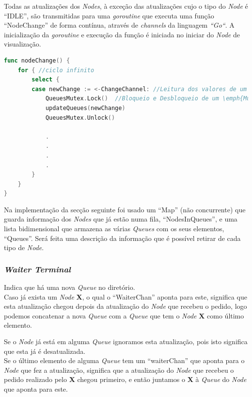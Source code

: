 Todas as atualizações dos \emph{Nodes}, à exceção das atualizações cujo o tipo do \emph{Node} é ``IDLE'', são transmitidas para uma \emph{goroutine} que executa uma função ``NodeChange'' de forma contínua, através de \emph{channels} da linguagem \emph{``Go``}. A inicialização da \emph{goroutine} e execução da função é iniciada no iniciar do \emph{Node} de visualização.
\begin{lstlisting}[caption={Função ``NodeChange'' executada por uma ``goroutine'' e recebe as atualizações através de um \emph{Channel}},language=Go]
func nodeChange() {
	for { //ciclo infinito
		select {
		case newChange := <-ChangeChannel: //Leitura dos valores de um \emph{channel}
			QueuesMutex.Lock()  //Bloqueio e Desbloqueio de um \emph{Mutex} para a escrita
			updateQueues(newChange)  
			QueuesMutex.Unlock()

		    .
		    .
		    .
		    .
		}
	}
}


\end{lstlisting}

Na implementação da secção seguinte foi usado um ``Map'' (não concurrente) que guarda informação dos \emph{Nodes} que já estão numa fila, ``NodesInQueues'', e uma lista bidimensional que armazena as várias \emph{Queues} com os seus elementos, ``Queues''.
Será feita uma descrição da informação que é possível retirar de cada tipo de \emph{Node}.


\subsubsection*{\emph{Waiter Terminal}}
Indica que há uma nova \emph{Queue} no diretório. \\

Caso já exista um \emph{Node} \textbf{X},
o qual o ``WaiterChan'' aponta para este, significa que esta atualização chegou depois da atualização do \emph{Node} que recebeu o pedido,
logo podemos concatenar a nova \emph{Queue} com a \emph{Queue} que tem o \emph{Node} \textbf{X} como último elemento.

Se o \emph{Node} já está em alguma \emph{Queue} ignoramos esta atualização, pois isto significa que esta já é desatualizada.\\
Se o último elemento de alguma \emph{Queue} tem um ``waiterChan'' que aponta para o \emph{Node} que fez a atualização, significa que a atualização do \emph{Node} que recebeu o pedido realizado pelo \textbf{X} chegou primeiro, e então juntamos o \textbf{X} à \emph{Queue} do \emph{Node} que aponta para este.\\

